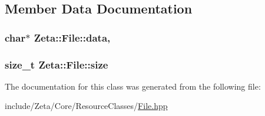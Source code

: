 \subsection{Member Data Documentation}
\hypertarget{classZeta_1_1File_ada4a3a7dbe4e52d9176e84b99d33c19c}{
\subsubsection[{data}]{\setlength{\rightskip}{0pt plus 5cm}char$\ast$ Zeta\+::\+File\+::data\hspace{0.3cm}{\ttfamily [mutable]}, {\ttfamily [protected]}}}\label{classZeta_1_1File_ada4a3a7dbe4e52d9176e84b99d33c19c}
\hypertarget{classZeta_1_1File_a4693dd90932cd5d4c7303a101050a5ce}{
\subsubsection[{size}]{\setlength{\rightskip}{0pt plus 5cm}size\+\_\+t Zeta\+::\+File\+::size\hspace{0.3cm}{\ttfamily [protected]}}}\label{classZeta_1_1File_a4693dd90932cd5d4c7303a101050a5ce}


The documentation for this class was generated from the following file\+:\begin{DoxyCompactItemize}
\item 
include/\+Zeta/\+Core/\+Resource\+Classes/\hyperlink{File_8hpp}{File.\+hpp}\end{DoxyCompactItemize}
